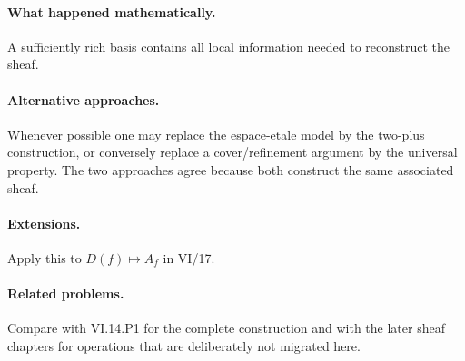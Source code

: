 \paragraph{What happened mathematically.}
A sufficiently rich basis contains all local information needed to reconstruct the sheaf.

\paragraph{Alternative approaches.}
Whenever possible one may replace the espace-etale model by the two-plus construction, or conversely replace a cover/refinement argument by the universal property.  The two approaches agree because both construct the same associated sheaf.

\paragraph{Extensions.}
Apply this to $D(f)\mapsto A_f$ in VI/17.

\paragraph{Related problems.}
Compare with VI.14.P1 for the complete construction and with the later sheaf chapters for operations that are deliberately not migrated here.
\fi
